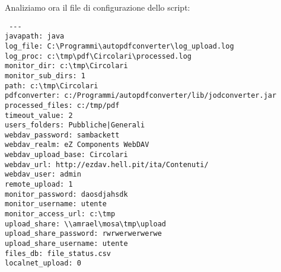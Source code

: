Analiziamo ora il file di configurazione dello script:
\begin{verbatim}
 ---
javapath: java
log_file: C:\Programmi\autopdfconverter\log_upload.log
log_proc: c:\tmp\pdf\Circolari\processed.log
monitor_dir: c:\tmp\Circolari
monitor_sub_dirs: 1
path: c:\tmp\Circolari
pdfconverter: c:/Programmi/autopdfconverter/lib/jodconverter.jar
processed_files: c:/tmp/pdf
timeout_value: 2
users_folders: Pubbliche|Generali
webdav_password: sambackett
webdav_realm: eZ Components WebDAV
webdav_upload_base: Circolari
webdav_url: http://ezdav.hell.pit/ita/Contenuti/
webdav_user: admin
remote_upload: 1
monitor_password: daosdjahsdk
monitor_username: utente
monitor_access_url: c:\tmp
upload_share: \\amrael\mosa\tmp\upload
upload_share_password: rwrwerwerwerwe
upload_share_username: utente
files_db: file_status.csv
localnet_upload: 0
\end{verbatim}
